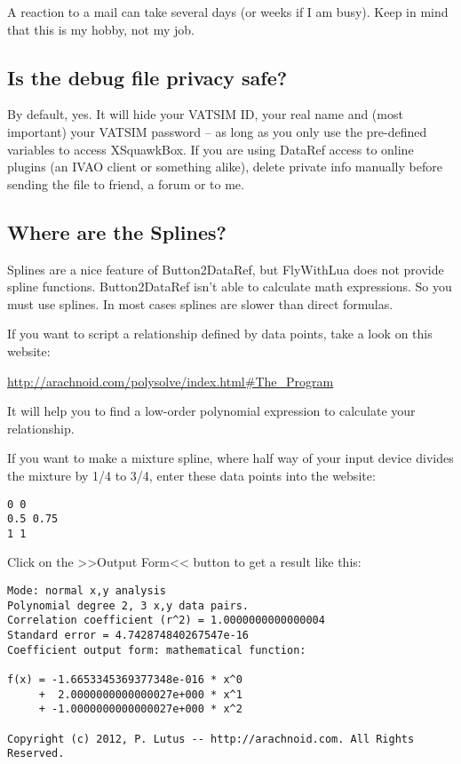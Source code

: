 \documentclass[11pt,parskip=half,a4paper]{scrartcl}
\begin{document}
A reaction to a mail can take several days (or weeks if I am busy). Keep in mind that this is my hobby, not my job.

\subsection{Is the debug file privacy safe?}

By default, yes. It will hide your VATSIM ID, your real name and (most important) your VATSIM password -- as long as you only use the pre-defined variables to access XSquawkBox. If you are using DataRef access to online plugins (an IVAO client or something alike), delete private info manually before sending the file to friend, a forum or to me.

\subsection{Where are the Splines?}

Splines are a nice feature of Button2DataRef, but FlyWithLua does not provide spline functions. Button2DataRef isn't able to calculate math expressions. So you must use splines. In most cases splines are slower than direct formulas.

If you want to script a relationship defined by data points, take a look on this website:

\url{http://arachnoid.com/polysolve/index.html#The_Program}

It will help you to find a low-order polynomial expression to calculate your relationship.

If you want to make a mixture spline, where half way of your input device divides the mixture by 1/4 to 3/4, enter these data points into the website:

\verb|0 0|\\
\verb|0.5 0.75|\\
\verb|1 1|

Click on the >>Output Form<< button to get a result like this:

\begin{lstlisting}[firstnumber=1]
Mode: normal x,y analysis
Polynomial degree 2, 3 x,y data pairs.
Correlation coefficient (r^2) = 1.0000000000000004
Standard error = 4.742874840267547e-16
Coefficient output form: mathematical function:

f(x) = -1.6653345369377348e-016 * x^0
     +  2.0000000000000027e+000 * x^1
     + -1.0000000000000027e+000 * x^2

Copyright (c) 2012, P. Lutus -- http://arachnoid.com. All Rights Reserved.
\end{lstlisting}
\end{document}
